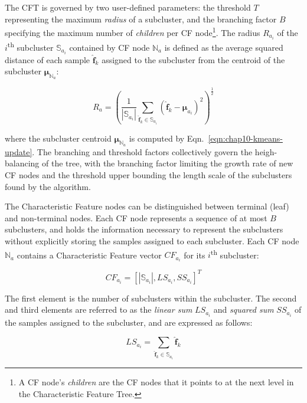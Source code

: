 The CFT is governed by two user-defined parameters: the threshold $T$ representing the maximum \textit{radius} of a subcluster, and the branching factor $B$ specifying the maximum number of \textit{children} per CF node\footnote{A CF node's \textit{children} are the CF nodes that it points to at the next level in the Characteristic Feature Tree.}. The radius $R_{a_{i}}$ of the $i$\textsuperscript{th} subcluster $\mathbb{S}_{a_{i}}$ contained by CF node $\mathbb{N}_{a}$ is defined as the average squared distance of each sample $\boldsymbol{\hat{f}}_{k}$ assigned to the subcluster from the centroid of the subcluster $\boldsymbol{\mu}_{\mathbb{N}_{a}}$:

\begin{equation}
\label{eqn:chap10-birch-radius}
R_{a} = \left(\frac{1}{|\mathbb{S}_{a_{i}}|}\displaystyle\sum\limits_{\boldsymbol{\hat{f}}_{k} \in \mathbb{S}_{a_{i}}} \left(\boldsymbol{\hat{f}}_{k} - \boldsymbol{\mu}_{a_{i}}\right)^{2}\right)^{\frac{1}{2}}
\end{equation}

\noindent where the subcluster centroid $\boldsymbol{\mu}_{\mathbb{N}_{a}}$ is computed by Eqn.~\ref{eqn:chap10-kmeans-update}. The branching and threshold factors collectively govern the heigh-balancing of the tree, with the branching factor limiting the growth rate of new CF nodes and the threshold upper bounding the length scale of the subclusters found by the algorithm. 

The Characteristic Feature nodes can be distinguished between terminal (leaf) and non-terminal nodes. Each CF node represents a sequence of at most $B$ subclusters, and holds the information necessary to represent the subclusters without explicitly storing the samples assigned to each subcluster. Each CF node $\mathbb{N}_{a}$ contains a Characteristic Feature vector $CF_{a_{i}}$ for its $i$\textsuperscript{th} subcluster:

\begin{equation}
\label{eqn:chap10-birch-cf}
CF_{a_{i}} = \left[|\mathbb{S}_{a_{i}}|, LS_{a_{i}}, SS_{a_{i}}\right]^{T}
\end{equation}

\noindent The first element is the number of subclusters within the subcluster. The second and third elements are referred to as the \textit{linear sum} $LS_{a_{i}}$ and \textit{squared sum} $SS_{a_{i}}$ of the samples assigned to the subcluster, and are expressed as follows:

\begin{equation}
\label{eqn:chap10-birch-linear-sum}
LS_{a_{i}} = \displaystyle\sum\limits_{\boldsymbol{\hat{f}}_{k} \in \mathbb{S}_{a_{i}}} \boldsymbol{\hat{f}}_{k}
\end{equation}

